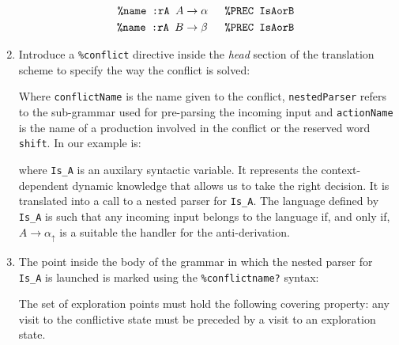\begin{enumerate}
\begin{eqnarray*}
\mbox{{\tt \%name :rA\ }}    A &\rightarrow \alpha &\mbox{\tt\ \%PREC IsAorB }\\
\mbox{{\tt \%name :rA\ }}    B &\rightarrow \beta  &\mbox{\tt\ \%PREC IsAorB }
\end{eqnarray*}
\item
\label{item:handler}
\label{subsection:hlppcr}
Introduce a \verb|%conflict| directive inside the {\it head} section of
the translation scheme to specify the way the conflict is solved:
\begin{center}
\begin{VERBATIM}[numbers=none, codes={\catcode`$=3\catcode`\_=8}]
\ldots
\textbf{%
\ldots
\end{VERBATIM}
\end{center}
Where \verb|conflictName| is the name given to the conflict,
\verb|nestedParser| refers to the sub-grammar used for pre-parsing the incoming input
and \verb|actionName| is the name of a production involved in the conflict
or the reserved word \verb|shift|. In our example is:

\begin{center}
\begin{VERBATIM}[numbers=none, codes={\catcode`$=3\catcode`\_=8}]
                \ldots
                \textbf{%
                \ldots
\end{VERBATIM}
\end{center}
where \verb|Is_A| is an auxilary syntactic variable.
It
represents the context-dependent
dynamic knowledge that allows us to take the right
decision.
It is translated into a call to a nested parser for \verb|Is_A|.
The language defined by \verb|Is_A|
is such that any incoming 
input belongs to the language if, and only if, 
$A \rightarrow \alpha_\uparrow$ is a suitable the handler
for the anti-derivation.

\item
The point inside the body of the grammar 
in which the nested parser for \verb|Is_A| is launched 
is marked 
using the \verb|%conflictname?| syntax:
\begin{center}
\end{center}
The set of exploration points must hold the following covering property:
any visit to the conflictive state 
must be preceded by a visit to 
an exploration state. 


\end{enumerate}

